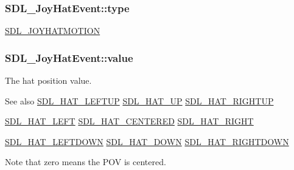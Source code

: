 \subsubsection[{\texorpdfstring{type}{type}}]{ S\+D\+L\+\_\+\+Joy\+Hat\+Event\+::type}\hypertarget{struct_s_d_l___joy_hat_event_ac583dafab46c44354e210a542aff57cc}{}\label{struct_s_d_l___joy_hat_event_ac583dafab46c44354e210a542aff57cc}
\hyperlink{_s_d_l__events_8h_a3b589e89be6b35c02e0dd34a55f3fccaafba4080bfbad335e520097b2024f0dff}{S\+D\+L\+\_\+\+J\+O\+Y\+H\+A\+T\+M\+O\+T\+I\+ON} 
\subsubsection[{\texorpdfstring{value}{value}}]{ S\+D\+L\+\_\+\+Joy\+Hat\+Event\+::value}\hypertarget{struct_s_d_l___joy_hat_event_a52b179a34407449941b61d988ca72ef4}{}\label{struct_s_d_l___joy_hat_event_a52b179a34407449941b61d988ca72ef4}
The hat position value. \begin{DoxySeeAlso}{See also}
\hyperlink{_s_d_l__joystick_8h_a6d7988b43c09ced08ec318a2556f1858}{S\+D\+L\+\_\+\+H\+A\+T\+\_\+\+L\+E\+F\+T\+UP} \hyperlink{_s_d_l__joystick_8h_ac916fe96c0740790e5496e12c67d8889}{S\+D\+L\+\_\+\+H\+A\+T\+\_\+\+UP} \hyperlink{_s_d_l__joystick_8h_a65fde978b4ab9c269c215d1922ae7755}{S\+D\+L\+\_\+\+H\+A\+T\+\_\+\+R\+I\+G\+H\+T\+UP} 

\hyperlink{_s_d_l__joystick_8h_a4666c12cae25d8bab053d8569396cd77}{S\+D\+L\+\_\+\+H\+A\+T\+\_\+\+L\+E\+FT} \hyperlink{_s_d_l__joystick_8h_adbfd6f0bad25cd1bb79f8c0a065f3833}{S\+D\+L\+\_\+\+H\+A\+T\+\_\+\+C\+E\+N\+T\+E\+R\+ED} \hyperlink{_s_d_l__joystick_8h_a5d1844afaf2ceaf58c689a8bd480a543}{S\+D\+L\+\_\+\+H\+A\+T\+\_\+\+R\+I\+G\+HT} 

\hyperlink{_s_d_l__joystick_8h_a3fa8609d382a0f74507890491033c784}{S\+D\+L\+\_\+\+H\+A\+T\+\_\+\+L\+E\+F\+T\+D\+O\+WN} \hyperlink{_s_d_l__joystick_8h_aa87f7a91d6bae8b420b133559d983338}{S\+D\+L\+\_\+\+H\+A\+T\+\_\+\+D\+O\+WN} \hyperlink{_s_d_l__joystick_8h_abf50339da11ca12699ee2199607d275f}{S\+D\+L\+\_\+\+H\+A\+T\+\_\+\+R\+I\+G\+H\+T\+D\+O\+WN}
\end{DoxySeeAlso}
Note that zero means the P\+OV is centered. 
